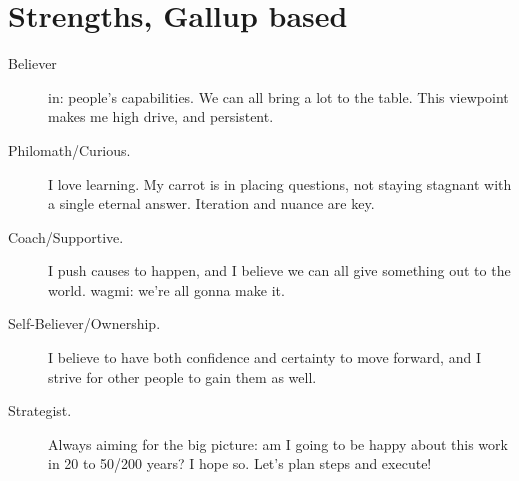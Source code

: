 \section*{Strengths, Gallup based}
\begin{description}
 \item[Believer] in:
 people's capabilities.
 We can all bring a lot to the table.
 This viewpoint makes me high drive, and persistent.
\item[Philomath/Curious.] I love learning. My carrot is in placing questions, %
not staying stagnant with a single eternal answer.
Iteration and nuance are key.
\item[Coach/Supportive.] I push causes to happen, and I believe we can all give something out to the world. wagmi: we're all gonna make it.
\item[Self-Believer/Ownership.] I believe to have both confidence and certainty to move forward, and I strive for other people to gain them as well.
\item[Strategist.] Always aiming for the big picture: am I going to be happy about this work in 20 to 50/200 years? I hope so. Let's plan steps and execute!
 \end{description}

